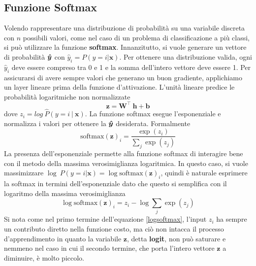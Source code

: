 \documentclass[12pt,a4paper]{report}
\begin{document}
    \subsection{Funzione Softmax} \label{sec:softmax}
    Volendo rappresentare una distribuzione di probabilit\`a su una 
    variabile discreta con $n$ possibili valori, come nel caso di un 
    problema di classificazione a pi\`u classi, si pu\`o utilizzare la 
    funzione \textbf{softmax}. Innanzitutto, si vuole generare un 
    vettore di probabilit\`a $\mbox{\boldmath{$\hat{y}$}}$ con 
    $\hat{y}_i= P(y=i|\textbf{x})$. Per ottenere una distribuzione 
    valida, ogni $\hat{y}_i$ deve essere compreso tra 0 e 1 e la somma 
    dell'intero vettore deve essere 1. Per assicurarsi di avere sempre
    valori che generano un buon gradiente, applichiamo un layer lineare
    prima della funzione d'attivazione. L'unit\`a lineare predice le
    probabilit\`a logaritmiche non normalizzate
    \begin{equation}
        \boldsymbol{z}=\boldsymbol{W}^\intercal\ \boldsymbol{h}+\boldsymbol{b}
    \end{equation}
    dove $z_i=log\ \hat{P}(y=i\ |\ \boldsymbol{x})$. La funzione softmax esegue 
    l'esponenziale e normalizza i valori per ottenere la $\mbox{\boldmath{$\hat{y}$}}$ 
    desiderata. Formalmente
    \begin{equation}
        \mathrm{softmax}(\boldsymbol{z})_i = \frac{\exp(z_i)}{\sum\limits_{j}\exp(z_j)}
    \end{equation}
    La presenza dell'esponenziale permette alla funzione softmax di 
    interagire bene con il metodo della massima verosimiglianza 
    logaritmica. In questo caso, si vuole massimizzare $\log\ P(y=i|
    \boldsymbol{x})=\log\mathrm{softmax}(\boldsymbol{z})_i$, quindi \`e
    naturale esprimere la softmax in termini dell'esponenziale dato che
    questo si semplifica con il logaritmo della massima verosimiglianza
    \begin{equation} \label{logsoftmax}
       \log\mathrm{softmax}(\boldsymbol{z})_i=z_i-\log\sum\limits_j\exp(z_j)
    \end{equation}
    Si nota come nel primo termine dell'equazione \ref{logsoftmax}, 
    l'input $z_i$ ha sempre un contributo diretto nella funzione costo,
    ma ci\`o non intacca il processo d'apprendimento in quanto la 
    variabile $\boldsymbol{z}$, detta \textbf{logit}, non pu\`o saturare
    e nemmeno nel caso in cui il secondo termine, che porta l'intero 
    vettore $\boldsymbol{z}$ a diminuire, \`e molto piccolo. 
\end{document}
